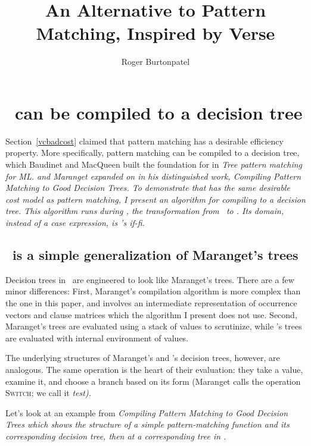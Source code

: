 \documentclass[manuscript,screen,review, 12pt, nonacm]{acmart}
\title{An Alternative to Pattern Matching, Inspired by Verse}
\author{Roger Burtonpatel}
\affiliation{%
\institution{Tufts University}
\streetaddress{419 Boston Ave}
  \city{Medford}
  \state{Massachusetts}
  \country{USA}
  \postcode{02155}
  }
\begin{document}
  

\section{\VMinus\ can be compiled to a decision tree}
\label{vminustod}
    Section~\ref{vcbadcost} claimed that pattern matching has a desirable
    efficiency property. More specifically, pattern matching can be compiled to
    a decision tree, which Baudinet and MacQueen built the foundation for in
    \it{Tree pattern matching for ML.}\cite{macqueen1985tree} and Maranget
    expanded on in his distinguished work, \it{Compiling Pattern Matching to
    Good Decision Trees}\cite{maranget}. To demonstrate that \VMinus has the
    same desirable cost model as pattern matching, I present an algorithm for
    compiling \VMinus to a decision tree. This algorithm runs during \DTran, the
    transformation from \VMinus\ to \D. Its domain, instead of a \it{case}
    expression, is \VMinus's \it{if-fi}. 
       
    \subsection{\D\ is a simple generalization of Maranget's trees} 


    Decision trees in \D\ are engineered to look like Maranget's trees. There
    are a few minor differences: First, Maranget's compilation algorithm is more
    complex than the one in this paper, and involves an intermediate
    representation of occurrence vectors and clause matrices which the algorithm
    I present does not use. Second, Maranget's trees are evaluated using a stack
    of values to scrutinize, while \D's trees are evaluated with internal
    environment of values. 

    The underlying structures of Maranget's and \D's decision trees, however,
    are analogous. The same operation is the heart of their evaluation: they
    take a value, examine it, and choose a branch based on its form (Maranget
    calls the operation \textsc{Switch}; we call it \it{test}). 

    Let's look at an example from \it{Compiling Pattern Matching to Good
    Decision Trees} which shows the structure of a simple pattern-matching
    function and its corresponding decision tree, then at a corresponding tree
    in \D. 
\end{document}
